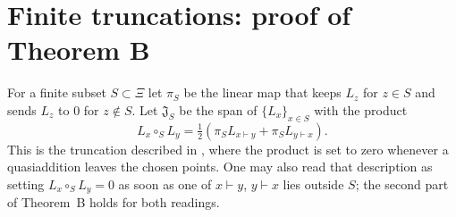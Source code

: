 \documentclass[11pt]{amsart}
\theoremstyle{definition}
\theoremstyle{remark}
\newcommand{\J}{\mathfrak{J}}
\newcommand{\qa}{\vdash}
\begin{document}
\section{Finite truncations: proof of Theorem B}

For a finite subset $S\subset\Xi$ let $\pi_S$ be the linear map that keeps $L_z$ for $z\in S$ and sends $L_z$ to $0$ for $z\notin S$. Let $\J_S$ be the span of $\{L_x\}_{x\in S}$ with the product
\begin{equation}\label{eq:trunc}
L_x\circ_SL_y=\tfrac12\left(\pi_SL_{x\qa y}+\pi_SL_{y\qa x}\right).
\end{equation}
This is the truncation described in \cite[Section~6]{CCAI23}, where the product is set to zero whenever a quasiaddition leaves the chosen points. One may also read that description as setting $L_x\circ_SL_y=0$ as soon as one of $x\qa y$, $y\qa x$ lies outside $S$; the second part of Theorem~B holds for both readings.
\end{document}
